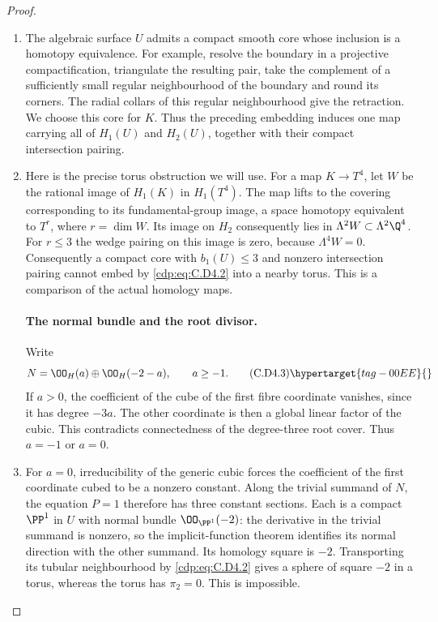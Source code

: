 \begin{proof}
\begin{enumerate}[label={$\langle1\rangle$\arabic*.},leftmargin=*]
\item The algebraic surface $U$ admits a compact smooth core whose
inclusion is a homotopy equivalence. For example, resolve the
boundary in a projective compactification, triangulate the
resulting pair, take the complement of a sufficiently small
regular neighbourhood of the boundary and round its corners.
The radial collars of this regular neighbourhood give the
retraction. We choose this core for $K$. Thus the preceding
embedding induces one map carrying all of $H_1(U)$ and
$H_2(U)$, together with their compact intersection pairing.

\item Here is the precise torus obstruction we will use. For a map
$K\to T^4$, let $W$ be the rational image of $H_1(K)$ in
$H_1(T^4)$. The map lifts to the covering corresponding to
its fundamental-group image, a space homotopy equivalent to
$T^r$, where $r=\dim W$. Its image on $H_2$ consequently lies
in $\Lambda^2W\subset\Lambda^2\Q^4$. For $r\le3$ the wedge
pairing on this image is zero, because $\Lambda^4W=0$.
Consequently a compact core with $b_1(U)\le3$ and nonzero
intersection pairing cannot embed by \eqref{cdp:eq:C.D4.2} into a nearby
torus. This is a comparison of the actual homology maps.

\paragraph{The normal bundle and the root divisor.}
Write
\[
                  N=\OO_H(a)\oplus\OO_H(-2-a),\qquad a\ge-1.
\tag{C.D4.3}\hypertarget{tag-00EE}{}\label{cdp:eq:C.D4.3}
\]
If $a>0$, the coefficient of the cube of the first fibre
coordinate vanishes, since it has degree $-3a$. The other
coordinate is then a global linear factor of the cubic.
This contradicts connectedness of the degree-three root
cover. Thus $a=-1$ or $a=0$.

\item For $a=0$, irreducibility of the generic cubic forces the
coefficient of the first coordinate cubed to be a nonzero
constant. Along the trivial summand of $N$, the equation
$P=1$ therefore has three constant sections. Each is a
compact $\PP^1$ in $U$ with normal bundle $\OO_{\PP^1}(-2)$:
the derivative in the trivial summand is nonzero, so the
implicit-function theorem identifies its normal direction
with the other summand. Its homology square is $-2$.
Transporting its tubular neighbourhood by \eqref{cdp:eq:C.D4.2} gives a
sphere of square $-2$ in a torus, whereas the torus has
$\pi_2=0$. This is impossible.


\end{enumerate}
\end{proof}
